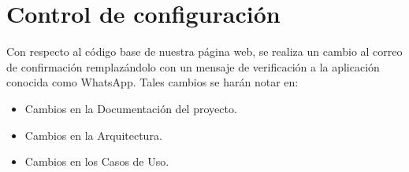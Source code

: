 \chapter{Control de configuraci\'on}
\label{intro}

Con respecto al código base de nuestra página web, se realiza un cambio al correo de confirmación remplazándolo con un mensaje de verificación a la
 aplicación conocida como WhatsApp.
Tales cambios se harán notar en:
\begin{itemize}
\item Cambios en la Documentación del proyecto.
\item Cambios en la Arquitectura.
\item Cambios en los Casos de Uso.
\end{itemize}



